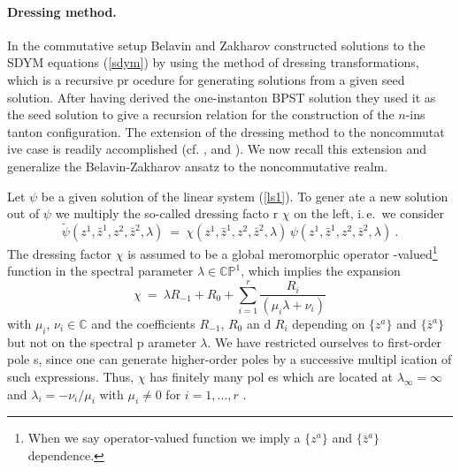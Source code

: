 \documentclass[a4paper,11pt,english]{article}
\numberwithin{equation}{section}
\renewcommand{\=}{\ =\ }
\begin{document}
\paragraph{Dressing method.} 
In the commutative setup Belavin and Zakharov constructed \cite{
Belavin:cz} solutions to the SDYM equations (\ref{sdym}) 
by using the method of dressing transformations, which is a recursive pr%
ocedure for generating solutions from a given seed solution. After having
derived the one-instanton BPST solution they used it as the seed %
solution to give a recursion relation for the construction of the $n$-ins%
tanton configuration. The extension of the dressing method to the noncommutat%
ive case is readily accomplished (cf. \cite{Lechtenfeld:2001aw}, \cite{
Lechtenfeld:2001gf} and \cite{Wolf:2002jw}). We now recall this extension
and generalize the Belavin-Zakharov ansatz to the noncommutative realm.

Let $\psi$ be a given solution of the linear system (\ref{ls1}). To gener%
ate a new solution out of $\psi$ we multiply the so-called dressing facto%
r $\chi$ on the left, i.\,e.\ we consider
\begin{equation}
 \tilde{\psi}(z^1,\bar{z}^1,z^2,\bar{z}^2,\lambda)\=\chi(z^1,\bar{z}^1,z%
^2,\bar{z}^2,\lambda)\,\psi(z^1,\bar{z}^1,z^2,\bar{z}^2,\lambda)\ .
\end{equation}
The dressing factor $\chi$ is assumed to be a global meromorphic operator%
-valued\footnote{When we say operator-valued function we imply a $\{z^a\}%
$ and $\{\bar{z}^a\}$ dependence.} function in the spectral parameter 
$\lambda\in\mathbb{CP}^1$, which implies the expansion
\begin{equation}\label{ansatzchi}
 \chi \= \lambda R_{-1}+R_0+\sum_{i=1}^r\frac{R_i}{(\mu_i\lambda+\nu_i%
)}
\end{equation}
with $\mu_i,\,\nu_i\in\mathbb{C}$ and the coefficients $R_{-1}$, $R_0$ an%
d $R_i$ depending on $\{z^a\}$ and $\{\bar{z}^a\}$ but not on the spectral p%
arameter $\lambda$. We have restricted ourselves to first-order pole%
s, since one can generate higher-order poles by a successive multipl%
ication of such expressions. Thus, $\chi$ has finitely many pol%
es which are located at $\lambda_\infty=\infty$ and $\lambda_i=-\nu_i%
/\mu_i$ with $\mu_i\neq 0$ for $i=1,\ldots,r$ .
\end{document}
